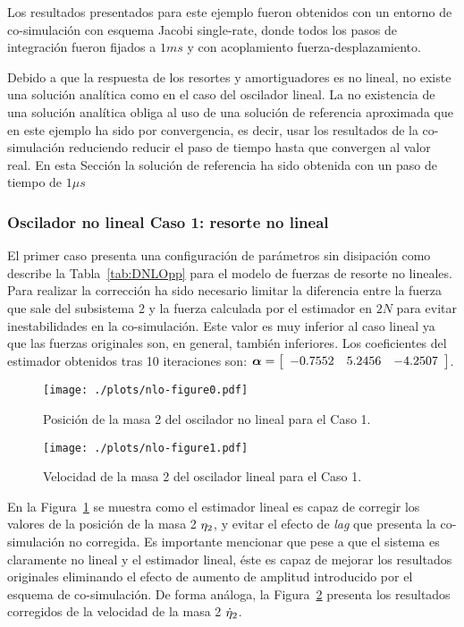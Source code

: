 Los resultados presentados para este ejemplo fueron obtenidos con un entorno de co-simulación con esquema Jacobi single-rate, donde todos los pasos de integración fueron fijados a $1\unit{ms}$ y con acoplamiento fuerza-desplazamiento. 

Debido a que la respuesta de los resortes y amortiguadores es no lineal, no existe una solución analítica como en el caso del oscilador lineal.
La no existencia de una solución analítica obliga al uso de una solución de referencia aproximada que en este ejemplo ha sido por convergencia, es decir, usar los resultados de la co-simulación reduciendo reducir el paso de tiempo hasta que convergen al valor real.
En esta Sección la solución de referencia ha sido obtenida con un paso de tiempo de $1\unit{\mu s}$ 


\subsubsection{Oscilador no lineal Caso 1: resorte no lineal}
\label{subsec:res_osciladorNL1}

El primer caso presenta una configuración de parámetros sin disipación como describe la Tabla~\ref{tab:DNLOpp} para el modelo de fuerzas de resorte no lineales.
Para realizar la corrección ha sido necesario limitar la diferencia entre la fuerza que sale del subsistema 2 y la fuerza calculada por el estimador en $2\unit{N}$ para evitar inestabilidades en la co-simulación.
Este valor es muy inferior al caso lineal ya que las fuerzas originales son, en general, también inferiores.
Los coeficientes del estimador obtenidos tras 10 iteraciones son:
$\coefficients = \sqbr{\matr{ccc}{-0.7552 & 5.2456 & -4.2507}}$.

\begin{figure}[ht!]\centering
	\texttt{[image: ./plots/nlo-figure0.pdf]}
	\caption{Posición de la masa 2 del oscilador no lineal para el Caso 1.}
	\label{fig:OsciladorNoLinealPos1}
\end{figure}

\begin{figure}[ht!]\centering
	\texttt{[image: ./plots/nlo-figure1.pdf]}
	\caption{Velocidad de la masa 2 del oscilador lineal para el Caso 1.}
	\label{fig:OsciladorNoLinealVel1}
\end{figure}

En la Figura~\ref{fig:OsciladorNoLinealPos1} se muestra como el estimador lineal es capaz de corregir los valores de la posición de la masa 2 $\displacement_2$, y evitar el efecto de \textit{lag} que presenta la co-simulación no corregida.
Es importante mencionar que pese a que el sistema es claramente no lineal y el estimador lineal, éste es capaz de mejorar los resultados originales eliminando el efecto de aumento de amplitud introducido por el esquema de co-simulación.
De forma análoga, la Figura~\ref{fig:OsciladorNoLinealVel1} presenta los resultados corregidos de la velocidad de la masa 2 $\velocity_2$.


